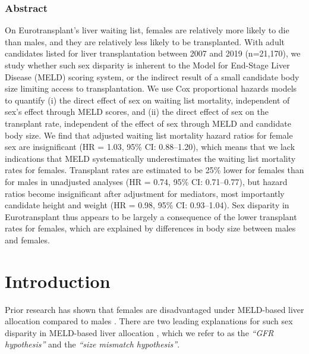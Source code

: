 \documentclass[11pt,twoside,]{book}
\begin{document}
\newpage
\normalsize

\subsubsection*{Abstract}

On Eurotransplant's liver waiting list, females are relatively more likely to
die than males, and they are relatively less likely to be transplanted. With adult
candidates listed for liver transplantation between 2007
and 2019 (n=21,170), we study whether such sex disparity
is inherent to the Model for End-Stage Liver Disease (MELD) scoring system,
or the indirect result of a small candidate body size limiting access to
transplantation. We use Cox proportional hazards models to quantify (i) the
direct effect of sex on waiting list mortality, independent of sex's effect
through MELD scores, and (ii) the direct effect of sex on the transplant rate,
independent of the effect of sex through MELD and candidate body size. We find that
adjusted waiting list mortality hazard ratios for female sex are insignificant
(HR = 1.03, 95\% CI: 0.88--1.20), which means that we lack indications that MELD
systematically underestimates the waiting list mortality rates for females.
Transplant rates are estimated to be 25\% lower for females than for males in unadjusted
analyses (HR = 0.74, 95\% CI: 0.71--0.77), but hazard ratios become insignificant
after adjustment for mediators, most importantly candidate height
and weight (HR = 0.98, 95\% CI: 0.93--1.04). Sex disparity in Eurotransplant
thus appears to be largely a consequence of the lower transplant rates for females,
which are explained by differences in body size between males and females.

\newpage

\normalsize

\section{Introduction}\label{introduction-1}

Prior research has shown that females are disadvantaged
under MELD-based liver allocation compared to males \citep{moylanDisparitiesLiverTransplantation2008, mathurSexBasedDisparitiesLiver2011, laiHeightContributesGender2010, lockeQuantifyingSexBasedDisparities2020a}.
There are two leading
explanations for such sex disparity in MELD-based liver allocation \citep{vernaTimeActionAddress2020}, which we refer to as the \emph{``GFR hypothesis''} and the \emph{``size mismatch hypothesis''}.
\end{document}
